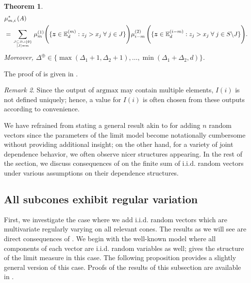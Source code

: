 \documentclass[aos]{imsart}
\numberwithin{equation}{section}
\theoremstyle{plain} %
\newtheorem{theorem}{Theorem}[section]
\theoremstyle{remark}
\newtheorem{remark}[theorem]{Remark}
\newcommand{\E}{\mathbb{E}}
\def\bz{\boldsymbol z}
\begin{document}
\begin{theorem}
 \begin{align*}
        &\mu_{m,i}^*\left(A\right)\\
         &=\sum_{\genfrac{}{}{0pt}{}{J\subseteq S\cup \{\emptyset\}}{|J|=m}} \mu_{m}^{(1)}\Bigg(\{\bz\in\E_d^{(m)}: z_{j}>x_{j}\;\forall\;j\in J\}\Bigg)
        \mu_{i-m}^{(2)}\,\Bigg(\{\bz\in\E_d^{(i-m)}:  z_{j}>x_{j}\;\forall\; j\in S\backslash J\}\Bigg).
 \end{align*}
 Moreover, $\Delta^{\oplus} \in \{\max(\Delta_1+1,\Delta_2+1), \ldots, \min(\Delta_1+\Delta_2,d)\}$.
 \end{theorem}

The proof of  is given in .


\begin{remark}
Since the output of $\text{argmax}$ may contain multiple elements, $I(i)$ is not defined uniquely; hence, a value for $I(i)$ is often chosen from these outputs  according to convenience.
\end{remark}


We have refrained from stating a general result akin to  for adding $n$ random vectors since the parameters of the limit model become notationally cumbersome without providing additional insight; on the other hand, for a variety of joint dependence behavior, we often observe nicer structures appearing.
In the rest of the section, we discuss consequences of  on the finite sum of  i.i.d.  random vectors under various assumptions on their dependence structures.


\subsection{All subcones exhibit regular variation}\label{subsec:hrvinallcones}
First, we investigate the case where we add  i.i.d.  random vectors which are multivariate regularly varying on all relevant cones. The results as we will see are direct consequences of . We begin with the well-known model where all components of each vector are  i.i.d.  random variables as well;  gives the structure of the limit measure in this case. The following proposition provides a slightly general version of this case. Proofs of the results of this subsection are available in .
\end{document}
